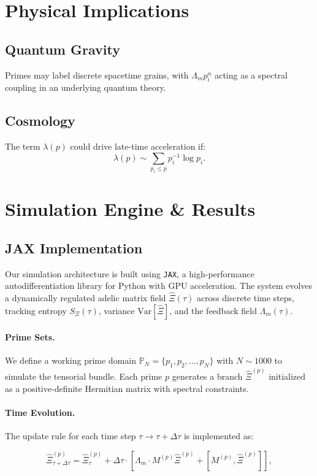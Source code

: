 \documentclass{article}
\theoremstyle{plain}
\theoremstyle{claimstyle}
\begin{document}
\section{Physical Implications}
\subsection{Quantum Gravity}
Primes may label discrete spacetime grains, with \( \Lambda_m p_i^\alpha \) acting as a spectral coupling in an underlying quantum theory.

\subsection{Cosmology}
The term \( \lambda(p) \) could drive late-time acceleration if:
\[
\lambda(p) \sim \sum_{p_i \leq p} p_i^{-1} \log p_i.
\]


\section{Simulation Engine \& Results}

\subsection{JAX Implementation}

Our simulation architecture is built using \texttt{JAX}, a high-performance autodifferentiation library for Python with GPU acceleration. The system evolves a dynamically regulated adelic matrix field $\hat{\Xi}(\tau)$ across discrete time steps, tracking entropy $S_\Xi(\tau)$, variance $\text{Var}[\hat{\Xi}]$, and the feedback field $\Lambda_m(\tau)$.

\paragraph{Prime Sets.} We define a working prime domain $\mathbb{P}_N = \{p_1, p_2, \dots, p_N\}$ with $N \sim 1000$ to simulate the tensorial bundle. Each prime $p$ generates a branch $\hat{\Xi}^{(p)}$ initialized as a positive-definite Hermitian matrix with spectral constraints.

\paragraph{Time Evolution.} The update rule for each time step $\tau \rightarrow \tau + \Delta\tau$ is implemented as:

\begin{equation}
\hat{\Xi}^{(p)}_{\tau+\Delta\tau} = \hat{\Xi}^{(p)}_\tau + \Delta\tau \cdot \left[ \Lambda_m \cdot M^{(p)} \hat{\Xi}^{(p)} + \left[ M^{(p)}, \hat{\Xi}^{(p)} \right] \right],
\end{equation}
\end{document}
